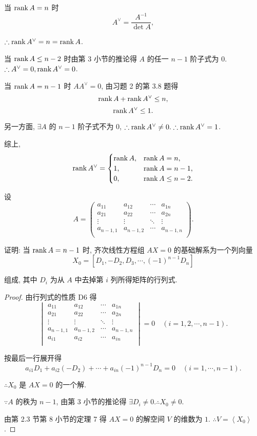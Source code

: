 \documentclass{ctexart}
\begin{document}
\begin{solution}
    当 $\operatorname{rank} A=n$ 时
    \[A^\vee=\dfrac{A^{-1}}{\det A},\]

    $\therefore\operatorname{rank} A^\vee=n=\operatorname{rank} A$.

    当 $\operatorname{rank} A\leq n-2$ 时由第 3 小节的推论得 $A$ 的任一 $n-1$ 阶子式为 $0$. $\therefore A^\vee=0,\operatorname{rank} A^\vee=0$.

    当 $\operatorname{rank} A=n-1$ 时 $AA^\vee=0$, 由习题 2 的第 3.8 题得
    \[\operatorname{rank} A+\operatorname{rank} A^\vee\leq n,\]
    \[\operatorname{rank} A^\vee\leq1.\]

    另一方面, $\exists A$ 的 $n-1$ 阶子式不为 $0$, $\therefore\operatorname{rank} A^\vee\neq0.\therefore\operatorname{rank} A^\vee=1$.

    综上,
    \[\operatorname{rank} A^\vee=\begin{cases}
        \operatorname{rank} A, & \operatorname{rank} A=n, \\
        1, & \operatorname{rank} A=n-1, \\
        0, & \operatorname{rank} A\leq n-2. \\
    \end{cases}\]
\end{solution}
\begin{exercise}%
    设
    \[A=\begin{pmatrix}
        a_{11} & a_{12} & \cdots & a_{1n} \\
        a_{21} & a_{22} & \cdots & a_{2n} \\
        \vdots & \vdots & \ddots & \vdots \\
        a_{n-1,1} & a_{n-1,2} & \cdots & a_{n-1,n} \\
    \end{pmatrix}.\]

    证明: 当 $\operatorname{rank} A=n-1$ 时, 齐次线性方程组 $AX=0$ 的基础解系为一个列向量
    \[X_0=[D_1,-D_2,D_3,\cdots,(-1)^{n-1}D_n]\]

    组成, 其中 $D_i$ 为从 $A$ 中去掉第 $i$ 列所得矩阵的行列式.
\end{exercise}
\begin{proof}
    由行列式的性质 D6 得
    \[\begin{vmatrix}
        a_{11} & a_{12} & \cdots & a_{1n} \\
        a_{21} & a_{22} & \cdots & a_{2n} \\
        \vdots & \vdots & \ddots & \vdots \\
        a_{n-1,1} & a_{n-1,2} & \cdots & a_{n-1,n} \\
        a_{i1} & a_{i2} & \cdots & a_{in} \\
    \end{vmatrix}=0\quad(i=1,2,\cdots,n-1).\]

    按最后一行展开得
    \[a_{i1}D_1+a_{i2}(-D_2)+\cdots+a_{in}(-1)^{n-1}D_n=0\quad(i=1,\cdots,n-1).\]

    $\therefore X_0$ 是 $AX=0$ 的一个解.

    $\because A$ 的秩为 $n-1$, 由第 3 小节的推论得 $\exists D_i\neq0.\therefore X_0\neq0$.

    由第 2.3 节第 8 小节的定理 7 得 $AX=0$ 的解空间 $V$ 的维数为 $1$. $\therefore V=\left<X_0\right>$.
\end{proof}
\end{document}
